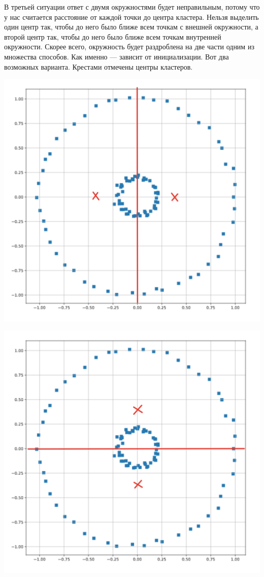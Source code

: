 \documentclass[12pt, a4paper, oneside]{article}
\begin{document}
{В третьей ситуации ответ с двумя окружностями будет неправильным, потому что у нас считается расстояние от каждой точки до центра кластера. Нельзя выделить один центр так, чтобы до него было ближе всем точкам с внешней окружности, а второй центр так, чтобы до него было ближе всем точкам внутренней окружности. Скорее всего, окружность будет раздроблена на две части одним из множества способов. Как именно --- зависит от инициализации. Вот два возможных варианта. Крестами отмечены центры кластеров. 

\begin{minipage}[t]{0.45\textwidth}
	\begin{center}
		\includegraphics[scale=0.17]{circless1.png}
	\end{center}
\end{minipage}
\begin{minipage}[t]{0.45\textwidth}
	\begin{center}
		\includegraphics[scale=0.17]{circless2.png}

\end{center}
\end{minipage}}
\end{document}
